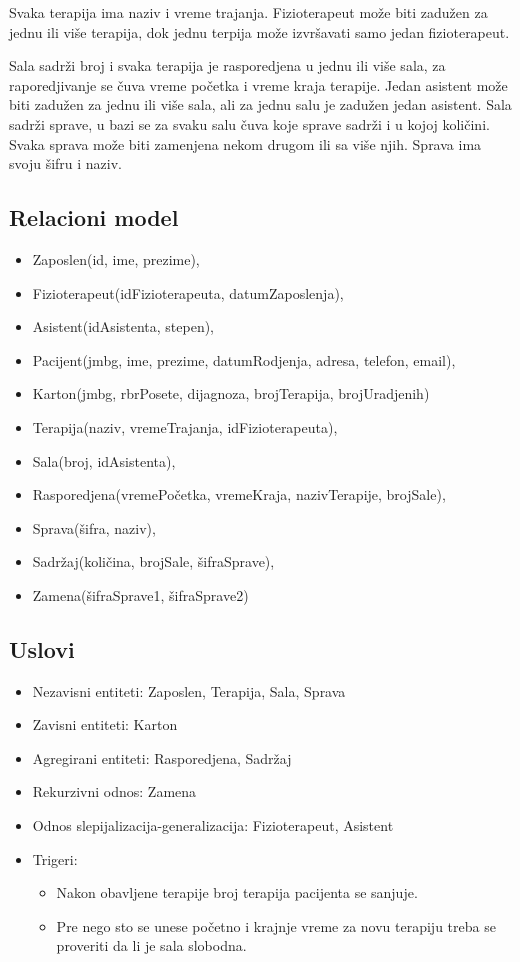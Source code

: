 \documentclass{article}
\begin{document}
Svaka terapija ima naziv i vreme trajanja. Fizioterapeut može biti zadužen za jednu ili više terapija, dok jednu terpija može izvršavati samo jedan fizioterapeut.

Sala sadrži broj i svaka terapija je rasporedjena u jednu ili više sala, za raporedjivanje se čuva vreme početka i vreme kraja terapije. Jedan asistent može biti zadužen za jednu ili više sala, ali za jednu salu je zadužen jedan asistent. Sala sadrži sprave, u bazi se za svaku salu čuva koje sprave sadrži i u kojoj količini. Svaka sprava može biti zamenjena nekom drugom ili sa više njih. Sprava ima svoju šifru i naziv.

\subsection{Relacioni model}
\begin{itemize} 
	\item Zaposlen(id, ime, prezime),
	\item Fizioterapeut(idFizioterapeuta, datumZaposlenja),
	\item Asistent(idAsistenta, stepen),
	\item Pacijent(jmbg, ime, prezime, datumRodjenja, adresa, telefon, email),
	\item Karton(jmbg, rbrPosete, dijagnoza, brojTerapija, brojUradjenih)
	\item Terapija(naziv, vremeTrajanja, idFizioterapeuta),
	\item Sala(broj, idAsistenta),
	\item Rasporedjena(vremePočetka, vremeKraja, nazivTerapije, brojSale),
	\item Sprava(šifra, naziv),
	\item Sadržaj(količina, brojSale, šifraSprave),
	\item Zamena(šifraSprave1, šifraSprave2)
\end{itemize}

\subsection{Uslovi}
\begin{itemize}
	\item Nezavisni entiteti: Zaposlen, Terapija, Sala, Sprava
	\item Zavisni entiteti: Karton
	\item Agregirani entiteti: Rasporedjena, Sadržaj
	\item Rekurzivni odnos: Zamena
	\item Odnos slepijalizacija-generalizacija: Fizioterapeut, Asistent
	\item Trigeri: 
		\begin{itemize}
			\item Nakon obavljene terapije broj terapija pacijenta se sanjuje.
			\item Pre nego sto se unese početno i krajnje vreme za novu terapiju treba se proveriti da li je sala slobodna.
		\end{itemize}	
\end{itemize}
\end{document}
